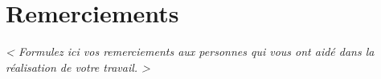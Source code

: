 \chapter*{Remerciements} %

\textit{< Formulez ici vos remerciements aux personnes qui vous ont aidé dans la réalisation de votre travail. >}